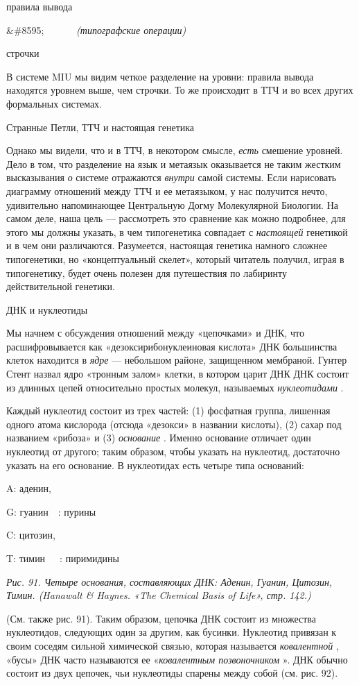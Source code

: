 правила вывода

\&\#8595;~~~~~~ \emph{(типографские операции)}

строчки

В системе MIU мы видим четкое разделение на уровни: правила вывода находятся уровнем выше, чем строчки. То же происходит в ТТЧ и во всех других формальных системах.

Странные Петли, ТТЧ и настоящая генетика

Однако мы видели, что и в ТТЧ, в некотором смысле, \emph{есть} смешение уровней. Дело в том, что разделение на язык и метаязык оказывается не таким жестким высказывания \emph{о} системе отражаются \emph{внутри} самой системы. Если нарисовать диаграмму отношений между ТТЧ и ее метаязыком, у нас получится нечто, удивительно напоминающее Центральную Догму Молекулярной Биологии. На самом деле, наша цель --- рассмотреть это сравнение как можно подробнее, для этого мы должны указать, в чем типогенетика совпадает с \emph{настоящей} генетикой и в чем они различаются. Разумеется, настоящая генетика намного сложнее типогенетики, но «концептуальный скелет», который читатель получил, играя в типогенетику, будет очень полезен для путешествия по лабиринту действительной генетики.

ДНК и нуклеотиды

Мы начнем с обсуждения отношений между «цепочками» и ДНК, что расшифровывается как «дезоксирибонуклеиновая кислота» ДНК большинства клеток находится в \emph{ядре} --- небольшом районе, защищенном мембраной. Гунтер Стент назвал ядро «тронным залом» клетки, в котором царит ДНК ДНК состоит из длинных цепей относительно простых молекул, называемых \emph{нуклеотидами} .

Каждый нуклеотид состоит из трех частей: (1) фосфатная группа, лишенная одного атома кислорода (отсюда «дезокси» в названии кислоты), (2) сахар под названием «рибоза» и (3) \emph{основание} . Именно основание отличает один нуклеотид от другого; таким образом, чтобы указать на нуклеотид, достаточно указать на его основание. В нуклеотидах есть четыре типа оснований:

A: аденин,

G: гуанин~~: пурины

C: цитозин,

T: тимин~~~: пиримидины

\emph{Рис. 91. Четыре основания, составляющих ДНК: Аденин, Гуанин, Цитозин, Тимин. (Hanawalt \& Haynes. «The Chemical Basis of Life», стр. 142.)}

(См. также рис. 91). Таким образом, цепочка ДНК состоит из множества нуклеотидов, следующих один за другим, как бусинки. Нуклеотид привязан к своим соседям сильной химической связью, которая называется \emph{ковалентной} , «бусы» ДНК часто называются ее «\emph{ковалентным позвоночником} ». ДНК обычно состоит из двух цепочек, чьи нуклеотиды спарены между собой (см. рис. 92).

